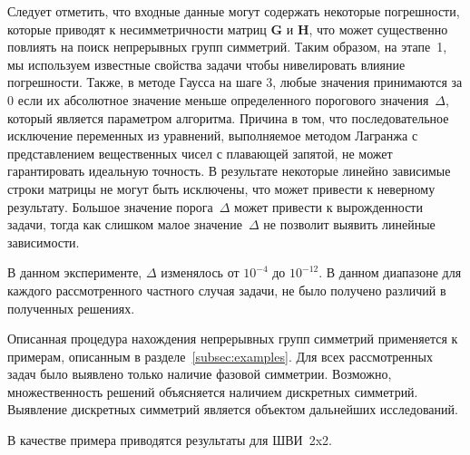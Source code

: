 {Следует отметить, что входные данные могут содержать некоторые погрешности, которые приводят к несимметричности матриц $\textbf{G}$ и $\textbf{H}$, что может существенно повлиять на поиск непрерывных групп симметрий. Таким образом, на этапе~1, мы используем известные свойства задачи чтобы нивелировать влияние погрешности.
Также, в методе Гаусса на шаге 3, любые значения принимаются за 0 если их абсолютное значение меньше определенного порогового значения~$\Delta$, который является параметром алгоритма. Причина в том, что последовательное исключение переменных из уравнений, выполняемое методом Лагранжа с представлением вещественных чисел с плавающей запятой, не может гарантировать идеальную точность.
В результате некоторые линейно зависимые строки матрицы не могут быть исключены, что может привести к неверному результату.
Большое значение порога~$\Delta$ может привести к вырожденности задачи, тогда как слишком малое значение~$\Delta$ не позволит выявить линейные зависимости.

В данном эксперименте, $\Delta$ изменялось от $ 10^{-4} $ до $ 10^{-12} $. В данном диапазоне для каждого рассмотренного частного случая задачи, не было получено различий в полученных решениях.


Описанная процедура нахождения непрерывных групп симметрий применяется к примерам, описанным в разделе~\ref{subsec:examples}. Для всех рассмотренных задач было выявлено только наличие фазовой симметрии. Возможно, множественность решений объясняется наличием дискретных симметрий. Выявление дискретных симметрий является объектом дальнейших исследований.

В качестве примера приводятся результаты для ШВИ~2x2.

}
